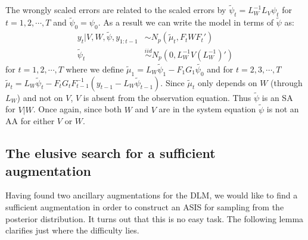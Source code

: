\documentclass{article}
\begin{document}
The wrongly scaled errors are related to the scaled errors by $\tilde{\psi}_t=L_W^{-1}L_V\psi_t$ for $t=1,2,\cdots,T$ and $\tilde{\psi}_0=\psi_0$. As a result we can write the model in terms of $\tilde{\psi}$ as:
 \begin{align*}
   y_t|V,W,\tilde{\psi},y_{1:t-1} &\sim N_p(\tilde{\mu}_t, F_tWF_t')\\
   \tilde{\psi}_t & \stackrel{iid}{\sim} N_p(0,L_W^{-1}V(L_W^{-1})')
\end{align*}
for $t=1,2,\cdots,T$ where we define $\tilde{\mu}_1 = L_W\tilde{\psi}_1 - F_1G_1\tilde{\psi_0}$ and for $t=2,3,\cdots,T$ $\tilde{\mu}_t =L_W\tilde{\psi}_t - F_tG_tF_{t-1}^{-1}(y_{t-1} - L_{W}\tilde{\psi}_{t-1})$. Since $\tilde{\mu}_t$ only depends on $W$ (through $L_W$) and not on $V$, $V$ is absent from the observation equation. Thus $\tilde{\psi}$ is an SA for $V|W$. Once again, since both $W$ and $V$ are in the system equation $\tilde{\psi}$ is not an AA for either $V$ or $W$.

\subsection{The elusive search for a sufficient augmentation}

Having found two ancillary augmentations for the DLM, we would like to find a sufficient augmentation in order to construct an ASIS for sampling from the posterior distribution. It turns out that this is no easy task. The following lemma clarifies just where the difficulty lies. 
\end{document}
